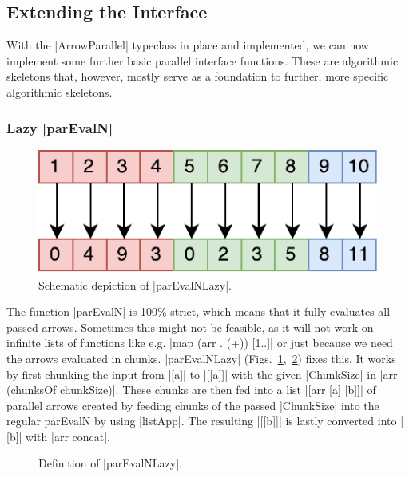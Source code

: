 \subsection{Extending the Interface}
\label{sec:extending-interface}
With the |ArrowParallel| typeclass in place and implemented, we can now implement some further basic parallel interface functions. These are algorithmic skeletons that, however, mostly serve as a foundation to further, more specific algorithmic skeletons.

\subsubsection{Lazy |parEvalN|}
\begin{figure}[tb]
	\includegraphics[scale=0.7]{images/parEvalNLazy}
	\caption{Schematic depiction of |parEvalNLazy|.}
	\label{fig:parEvalNLazyImg}
\end{figure}
The function |parEvalN| is 100\% strict, which means that it fully evaluates all passed arrows. Sometimes this might not be feasible, as it will not work on infinite lists of functions like e.g. |map (arr . (+)) [1..]| or just because we need the arrows evaluated in chunks. |parEvalNLazy| (Figs.~\ref{fig:parEvalNLazyImg},~\ref{fig:parEvalNLazy}) fixes this. It works by first chunking the input from |[a]| to |[[a]]| with the given |ChunkSize| in |arr (chunksOf chunkSize)|. These chunks are then fed into a list |[arr [a] [b]]| of parallel arrows created by feeding chunks of the passed |ChunkSize| into the regular parEvalN by using |listApp|. The resulting |[[b]]| is lastly converted into |[b]| with |arr concat|.
\begin{figure}[t]
\caption{Definition of |parEvalNLazy|.}
\label{fig:parEvalNLazy}
\end{figure}

